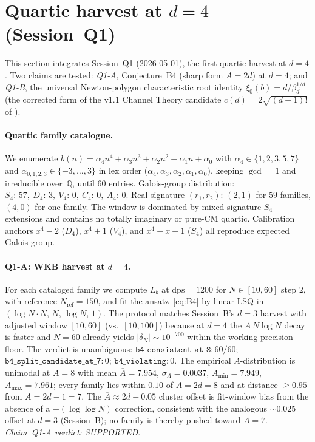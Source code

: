 \documentclass[11pt,a4paper]{article}
\theoremstyle{definition}
\theoremstyle{remark}
\newcommand{\Q}{\mathbb{Q}}
\begin{document}
\section{Quartic harvest at $d=4$ (Session~Q1)}\label{sec:Q1-quartic}

This section integrates Session~Q1 (2026-05-01), the first quartic
harvest at $d=4$. Two claims are tested: \emph{Q1-A}, Conjecture~B4
(sharp form $A=2d$) at $d=4$; and \emph{Q1-B}, the universal
Newton-polygon characteristic root identity
$\xi_0(b)=d/\beta_d^{1/d}$ (the corrected form of the v1.1 Channel
Theory candidate $c(d)=2\sqrt{(d-1)!}$ of
\cite{Papanokechi2026Channel}).

\paragraph{Quartic family catalogue.}
We enumerate
$b(n)=\alpha_{4}n^{4}+\alpha_{3}n^{3}+\alpha_{2}n^{2}+\alpha_{1}n+\alpha_{0}$
with $\alpha_{4}\in\{1,2,3,5,7\}$ and
$\alpha_{0,1,2,3}\in\{-3,\ldots,3\}$ in lex order
($\alpha_{4},\alpha_{3},\alpha_{2},\alpha_{1},\alpha_{0}$), keeping
$\gcd=1$ and irreducible over~$\Q$, until $60$ entries. Galois-group
distribution: $S_{4}{:}\,57,\ D_{4}{:}\,3,\ V_{4}{:}\,0,\ C_{4}{:}\,0,\ A_{4}{:}\,0$.
Real signature $(r_{1},r_{2})$: $(2,1)$ for $59$ families, $(4,0)$
for one family. The window is dominated by mixed-signature $S_{4}$
extensions and contains no totally imaginary or pure-CM quartic.
Calibration anchors $x^{4}-2$ ($D_{4}$), $x^{4}+1$ ($V_{4}$), and
$x^{4}-x-1$ ($S_{4}$) all reproduce expected Galois group.

\paragraph{Q1-A: WKB harvest at $d=4$.}
For each cataloged family we compute $L_{b}$ at $\mathrm{dps}=1200$
for $N\in[10,60]$ step $2$, with reference $N_{\mathrm{ref}}=150$,
and fit the ansatz~\eqref{eq:B4} by linear LSQ in
$(\log N\cdot N,\,N,\,\log N,\,1)$. The protocol matches Session~B's
$d=3$ harvest with adjusted window $[10,60]$ (vs.\ $[10,100]$)
because at $d=4$ the $A\,N\log N$ decay is faster and $N=60$ already
yields $|\delta_{N}|\sim 10^{-700}$ within the working precision floor.
The verdict is unambiguous: $\mathtt{b4\_consistent\_at\_8}: 60/60$;
$\mathtt{b4\_split\_candidate\_at\_7}: 0$;
$\mathtt{b4\_violating}: 0$. The empirical $A$-distribution is
unimodal at $A=8$ with mean $\overline{A}=7.954$,
$\sigma_{A}=0.0037$, $A_{\min}=7.949$, $A_{\max}=7.961$; every
family lies within $0.10$ of $A=2d=8$ and at distance $\ge 0.95$
from $A=2d-1=7$. The $\overline{A}\approx 2d-0.05$ cluster offset is
fit-window bias from the absence of a $-(\log\log N)$ correction,
consistent with the analogous $\sim\!0.025$ offset at $d=3$
(Session~B); no family is thereby pushed toward $A=7$.
\emph{Claim~Q1-A verdict: SUPPORTED}.
\end{document}
